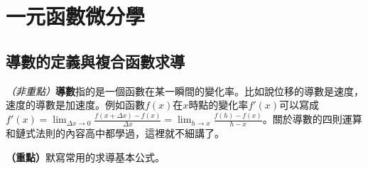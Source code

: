 \documentclass[12pt, addpoints]{exam}
\def \important{\textbf{（重點）}}
\def \unimportant{\textit{（非重點）}}
\begin{document}
\newpage %

\section{一元函數微分學}

\subsection{導數的定義與複合函數求導}

\begin{questions}

\question
\unimportant \textbf{導數}指的是一個函數在某一瞬間的變化率。比如說位移的導數是速度，速度的導數是加速度。例如函數$f(x)$在$x$時點的變化率$f'(x)$可以寫成$\displaystyle f'(x)=\lim_{\Delta x \to 0} \frac{f(x+\Delta x)-f(x)}{\Delta x}=\lim_{h \to x} \frac{f(h)-f(x)}{h-x}$。關於導數的四則運算和鏈式法則的內容高中都學過，這裡就不細講了。

\question
\important 默寫常用的求導基本公式。
\end{questions}
\end{document}
